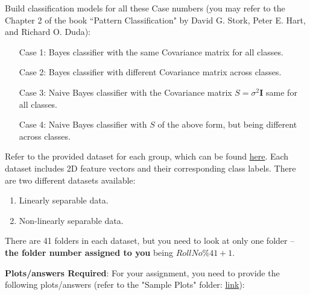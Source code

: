 \documentclass[solution,addpoints,12pt]{exam}
\begin{document}
\begin{questions}
Build classification models for all these Case numbers (you may refer to the Chapter 2 of the book ``Pattern Classification" by David G. Stork, Peter E. Hart, and Richard O. Duda):
\begin{enumerate}
    \item[Case 1:] Bayes classifier with the same Covariance matrix for all classes.
    \item[Case 2:] Bayes classifier with different Covariance matrix across classes.
    \item[Case 3:] Naive Bayes classifier with the Covariance matrix $S = \sigma^2 \mathbf{I}$ same for all classes.
    \item[Case 4:] Naive Bayes classifier with $S$ of the above form, but being different across classes.
\end{enumerate}
    
Refer to the provided dataset for each group, which can be found  \href{https://drive.google.com/drive/folders/1YwSDijf-LOF3HZwSBoMc5R02TH_o12s3?usp=sharing}{here}. Each dataset includes 2D feature vectors and their corresponding class labels. There are two different datasets available:
\begin{enumerate}
    \item Linearly separable data.
    \item Non-linearly separable data.
\end{enumerate}
There are 41 folders in each dataset, but you need to look at only one folder -- {\bf the folder number assigned to you} being $RollNo\%41 + 1$.
    
\textbf{Plots/answers Required}:
For your assignment, you need to provide the following plots/answers (refer to the "Sample Plots" folder: \href{https://drive.google.com/drive/folders/1YwSDijf-LOF3HZwSBoMc5R02TH_o12s3?usp=sharing}{link}):
    
\end{questions}
\end{document}
